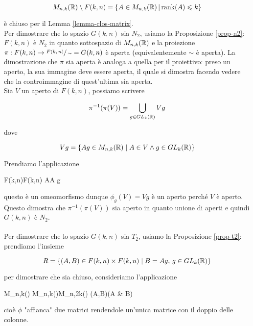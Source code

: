 \begin{equation}
	M_{n,k}(\mathbb{R}) \setminus F(k,n) = \left\{ A \in M_{n,k}(\mathbb{R}) \, \middle| \, \rank(A) \leqslant k \right\}
\end{equation}

è chiuso per il Lemma \ref{lemma-clos-matrix}.\\
Per dimostrare che lo spazio $ G(k,n) $ sia $ N_{2} $, usiamo la Proposizione \ref{prop-n2}: $ F(k,n) $ è $ N_{2} $ in quanto sottospazio di $ M_{n,k}(\mathbb{R}) $ e la proiezione $ \pi : F(k,n) \to \sfrac{F(k,n)}{\sim} = G(k,n) $ è aperta (equivalentemente $ \sim $ è aperta).
La dimostrazione che $ \pi $ sia aperta è analoga a quella per il proiettivo: preso un aperto, la sua immagine deve essere aperta, il quale si dimostra facendo vedere che la controimmagine di quest'ultima sia aperta.\\
Sia $ V $ un aperto di $ F(k,n) $, possiamo scrivere

\begin{align}
	\begin{split}
		\pi^{-1}(\pi(V)) = \bigcup_{g \in GL_{k}(\mathbb{R})} V g
	\end{split}
\end{align}

dove

\begin{equation}
	V g = \{ A g \in M_{n,k}(\mathbb{R}) \mid A \in V \wedge g \in GL_{k}(\mathbb{R}) \}
\end{equation}

Prendiamo l'applicazione

%
	{F(k,n)}{F(k,n)}%
	{A}{A g}

questo è un omeomorfismo dunque $ \phi_{g}(V) = V g $ è un aperto perché $ V $ è aperto. Questo dimostra che $ \pi^{-1}(\pi(V)) $ sia aperto in quanto unione di aperti e quindi $ G(k,n) $ è $ N_{2} $.\\\\
%
Per dimostrare che lo spazio $ G(k,n) $ sia $ T_{2} $, usiamo la Proposizione \ref{prop-t2}: prendiamo l'insieme

\begin{equation}
	R = \{ (A,B) \in F(k,n) \times F(k,n) \mid B = A g, \, g \in GL_{k}(\mathbb{R}) \}
\end{equation}

per dimostrare che sia chiuso, consideriamo l'applicazione

\map{\phi}%
	{M_{n,k}(\R) \times M_{n,k}(\R)}{M_{n,2k}(\R)}%
	{(A,B)}{\mqty(A & B)}

cioè $ \phi $ "affianca" due matrici rendendole un'unica matrice con il doppio delle colonne.

